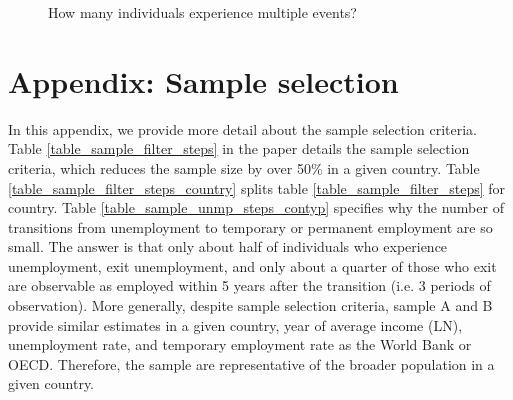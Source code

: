 \documentclass[12pt]{article}
\begin{document}
\begin{figure}
    \caption{How many individuals experience multiple events?}
    \label{graph_country_events_multiple_presentation_num_paper}
\end{figure}

\clearpage
\section{Appendix: Sample selection}\label{sec:sample_selection}
\setcounter{figure}{0}    
\setcounter{table}{0}    
\renewcommand*\thetable{\Alph{section}.\arabic{table}}
\renewcommand*\thefigure{\Alph{section}.\arabic{figure}}
\renewcommand{\theHfigure}{\Alph{section}.\arabic{table}}
\renewcommand{\theHtable}{\Alph{section}.\arabic{figure}}

In this appendix, we provide more detail about the sample selection criteria.  Table \ref{table_sample_filter_steps} in the paper details the sample selection criteria, which reduces the sample size by over 50\% in a given country.  Table \ref{table_sample_filter_steps_country} splits table \ref{table_sample_filter_steps} for country.  Table \ref{table_sample_unmp_steps_contyp} specifies why the number of transitions from unemployment to temporary or permanent employment are so small.  The answer is that only about half of individuals who experience unemployment, exit unemployment, and only about a quarter of those who exit are observable as employed within 5 years after the transition (i.e. 3 periods of observation).  More generally, despite sample selection criteria, sample A and B provide similar estimates in a given country, year of average income (LN), unemployment rate, and temporary employment rate as the World Bank  or OECD.  Therefore, the sample are representative of the broader population in a given country.
\end{document}

